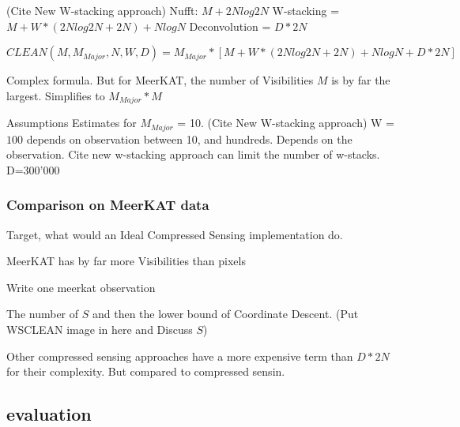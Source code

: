 (Cite New W-stacking approach)
Nufft: $M + 2N log 2N$
W-stacking = $M + W*(2N log 2N + 2N) + N log N$
Deconvolution = $D*2N$


\begin{equation}
CLEAN(M, M_{Major}, N,  W, D) = M_{Major} * [M + W*(2N log 2N + 2N) + N log N + D*2N]
\end{equation}

Complex formula. But for MeerKAT, the number of Visibilities $M$ is by far the largest. Simplifies to $M_{Major}*M$

Assumptions
Estimates for $M_{Major}$ = 10. (Cite New W-stacking approach)
W = $100$ depends on observation between 10, and hundreds. Depends on the observation. Cite new w-stacking approach can limit the number of w-stacks. 
D=300'000

\subsubsection{Comparison on MeerKAT data}
Target, what would an Ideal Compressed Sensing implementation do.

MeerKAT has by far more Visibilities than pixels

Write one meerkat observation

The number of $S$ and then the lower bound of Coordinate Descent. (Put WSCLEAN image in here and Discuss $S$)

Other compressed sensing approaches have a more expensive term than $D*2N$ for their complexity. But compared to compressed sensin.



\subsection{evaluation}

